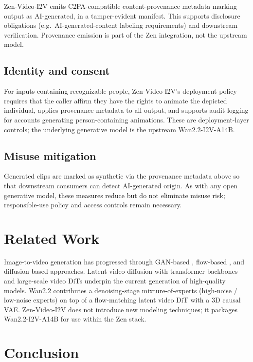 \documentclass[11pt,a4paper]{article}
\begin{document}
Zen-Video-I2V emits C2PA-compatible content-provenance metadata marking output as AI-generated, in a tamper-evident manifest. This supports disclosure obligations (e.g.\ AI-generated-content labeling requirements) and downstream verification. Provenance emission is part of the Zen integration, not the upstream model.

\subsection{Identity and consent}

For inputs containing recognizable people, Zen-Video-I2V's deployment policy requires that the caller affirm they have the rights to animate the depicted individual, applies provenance metadata to all output, and supports audit logging for accounts generating person-containing animations. These are deployment-layer controls; the underlying generative model is the upstream Wan2.2-I2V-A14B.

\subsection{Misuse mitigation}

Generated clips are marked as synthetic via the provenance metadata above so that downstream consumers can detect AI-generated origin. As with any open generative model, these measures reduce but do not eliminate misuse risk; responsible-use policy and access controls remain necessary.

\section{Related Work}

Image-to-video generation has progressed through GAN-based \cite{vidgan}, flow-based \cite{flowgen}, and diffusion-based \cite{stablevideo,svd} approaches. Latent video diffusion with transformer backbones \cite{dit,svd} and large-scale video DiTs underpin the current generation of high-quality models. Wan2.2 \cite{wan22repo,wan22hf} contributes a denoising-stage mixture-of-experts (high-noise / low-noise experts) on top of a flow-matching latent video DiT with a 3D causal VAE. Zen-Video-I2V does not introduce new modeling techniques; it packages Wan2.2-I2V-A14B for use within the Zen stack.

\section{Conclusion}
\end{document}
